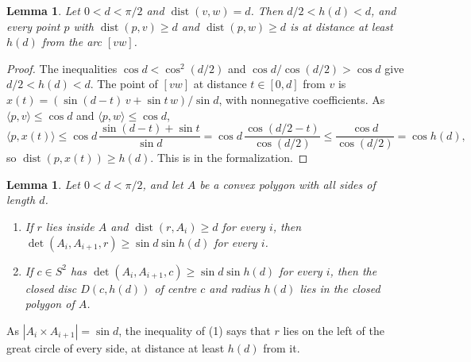 \documentclass[12pt]{amsart}
\newtheorem{lemma}[theorem]{Lemma}
\theoremstyle{definition}
\theoremstyle{plain}
\theoremstyle{definition}
\newcommand{\Sph}{S^2}
\newcommand{\dist}{\operatorname{dist}}
\newcommand{\leanmap}[1]{\ignorespaces}
\newcommand{\mapnote}[1]{\ignorespaces}
\begin{document}
\begin{lemma}\label{lem:edge}\leanmap{Tammes15.edge_distance, Tammes15.sin_sub_add_sin, Tammes15.hrad_bounds}
Let $0<d<\pi/2$ and $\dist(v,w)=d$. Then $d/2<h(d)<d$, and every point $p$ with $\dist(p,v)\ge d$ and $\dist(p,w)\ge d$ is at distance at least $h(d)$ from the arc $[vw]$.
\end{lemma}

\begin{proof}
The inequalities $\cos d<\cos^2(d/2)$ and $\cos d/\cos(d/2)>\cos d$ give $d/2<h(d)<d$. The point of $[vw]$ at distance $t\in[0,d]$ from $v$ is $x(t)=(\sin(d-t)\,v+\sin t\,w)/\sin d$, with nonnegative coefficients. As $\langle p,v\rangle\le\cos d$ and $\langle p,w\rangle\le\cos d$,
\[
\langle p,x(t)\rangle\le\cos d\,\frac{\sin(d-t)+\sin t}{\sin d}=\cos d\,\frac{\cos(d/2-t)}{\cos(d/2)}\le\frac{\cos d}{\cos(d/2)}=\cos h(d),
\]
so $\dist(p,x(t))\ge h(d)$. This is  in the formalization.
\end{proof}

\begin{lemma}\label{lem:disc}\leanmap{Tammes15.Geom.disc_side, Tammes15.Geom.inClosed_of_disc}\mapnote{for faces in cone form, by bounding the distance from $r$ to the great circle of each side}
Let $0<d<\pi/2$, and let $A$ be a convex polygon with all sides of length $d$.
\begin{enumerate}
\item If $r$ lies inside $A$ and $\dist(r,A_i)\ge d$ for every $i$, then $\det(A_i,A_{i+1},r)\ge\sin d\sin h(d)$ for every $i$.
\item If $c\in\Sph$ has $\det(A_i,A_{i+1},c)\ge\sin d\sin h(d)$ for every $i$, then the closed disc $D(c,h(d))$ of centre $c$ and radius $h(d)$ lies in the closed polygon of $A$.
\end{enumerate}
\end{lemma}

As $|A_i\times A_{i+1}|=\sin d$, the inequality of (1) says that $r$ lies on the left of the great circle of every side, at distance at least $h(d)$ from it.
\end{document}
